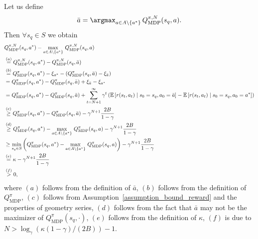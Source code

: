 \begin{myproof}
Let us define
\begin{align}
    \bar{a} = \argmax_{a \in A \setminus \{a^*\}} \, Q_\text{MDP}^{\pi, N}(s_q, a).
\end{align}
%
Then $\forall s_q \in S$ we obtain
\begin{align}
    &Q_\text{MDP}^{\pi, N}(s_q, a^*) - \max_{a \in A \setminus \{a^*\}} \, Q_\text{MDP}^{\pi, N}(s_q, a) \\
    &\stackrel{(a)}{=} Q_\text{MDP}^{\pi, N}(s_q, a^*) - Q_\text{MDP}^{\pi, N}(s_q, \bar{a}) \\
    &\stackrel{(b)}{=} Q_\text{MDP}^\pi(s_q, a^*) - \xi_{a^*} - \left(Q_\text{MDP}^\pi(s_q, \bar{a}) - \xi_{\bar{a}} \right) \\
    &= Q_\text{MDP}^\pi(s_q, a^*) - Q_\text{MDP}^\pi(s_q, \bar{a}) + \xi_{\bar{a}} - \xi_{a^*} \\
    &= Q_\text{MDP}^\pi(s_q, a^*) - Q_\text{MDP}^\pi(s_q, \bar{a}) + \sum_{t=N+1}^{\infty} \gamma^t \left({\mathbb E} \left[r(s_t, a_t) \mid s_0=s_q, a_0=\bar{a} \right] - {\mathbb E} \left[r(s_t, a_t) \mid s_0=s_q, a_0=a^* \right] \right) \\
    &\stackrel{(c)}{\geq} Q_\text{MDP}^\pi(s_q, a^*) - Q_\text{MDP}^\pi(s_q, \bar{a})  - \gamma^{N+1} \frac{2B}{1-\gamma} \\
    &\stackrel{(d)}{\geq} Q_\text{MDP}^\pi(s_q, a^*) - \max_{a \in A \setminus \{a^*\}} \, Q_\text{MDP}^\pi(s_q, a)  - \gamma^{N+1} \frac{2B}{1-\gamma} \\
    &\geq \min\limits_{s_q \in S} \left( Q_\text{MDP}^\pi(s_q, a^*) - \max_{a \in A \setminus \{a^*\}} \, Q_\text{MDP}^\pi(s_q, a) \right)  - \gamma^{N+1} \frac{2B}{1-\gamma} \\
    &\stackrel{(e)}{=}  \kappa - \gamma^{N+1} \frac{2B}{1-\gamma} \\
    &\stackrel{(f)}{>} 0,
\end{align}
%
where $(a)$ follows from the definition of $\bar{a}$, $(b)$ follows from the definition of $Q_\text{MDP}^\pi$, $(c)$ follows from Assumption~\ref{assumption_bound_reward} and the properties of geometry series, $(d)$ follows from the fact that $\bar{a}$ may not be the maximizer of $Q_\text{MDP}^\pi(s_q, \cdot)$, $(e)$ follows from the definition of $\kappa$, $(f)$ is due to $N > \log_\gamma \left( \kappa (1-\gamma)/(2B) \right)-1$.



\end{myproof}
